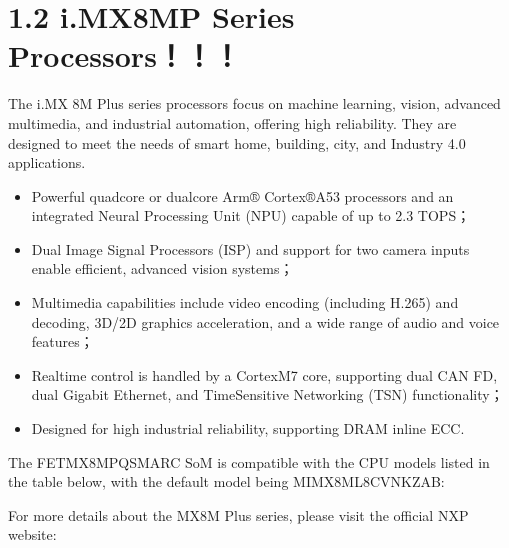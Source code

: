 \documentclass[letterpaper,10pt,openany,english]{sphinxmanual}
\begin{document}
\section{1.2 i.MX8MP Series Processors！！！}
\label{\detokenize{hardware:i-mx8mp-series-processors}}
\sphinxAtStartPar
The i.MX 8M Plus series processors focus on machine learning, vision, advanced multimedia, and industrial automation, offering high reliability. They are designed to meet the needs of smart home, building, city, and Industry 4.0 applications.
\begin{itemize}
\item {} 
\sphinxAtStartPar
Powerful quad\sphinxhyphen{}core or dual\sphinxhyphen{}core Arm® Cortex®\sphinxhyphen{}A53 processors and an integrated Neural Processing Unit (NPU) capable of up to 2.3 TOPS；

\item {} 
\sphinxAtStartPar
Dual Image Signal Processors (ISP) and support for two camera inputs enable efficient, advanced vision systems；

\item {} 
\sphinxAtStartPar
Multimedia capabilities include video encoding (including H.265) and decoding, 3D/2D graphics acceleration, and a wide range of audio and voice features；

\item {} 
\sphinxAtStartPar
Real\sphinxhyphen{}time control is handled by a Cortex\sphinxhyphen{}M7 core, supporting dual CAN FD, dual Gigabit Ethernet, and Time\sphinxhyphen{}Sensitive Networking (TSN) functionality；

\item {} 
\sphinxAtStartPar
Designed for high industrial reliability, supporting DRAM inline ECC.

\end{itemize}

\sphinxAtStartPar
{}

\sphinxAtStartPar
The FET\sphinxhyphen{}MX8MPQ\sphinxhyphen{}SMARC SoM is compatible with the CPU models listed in the table below, with the default model being MIMX8ML8CVNKZAB:

\sphinxAtStartPar
{}

\sphinxAtStartPar
For more details about the MX8M Plus series, please visit the official NXP website:

\sphinxAtStartPar
{}
\end{document}
